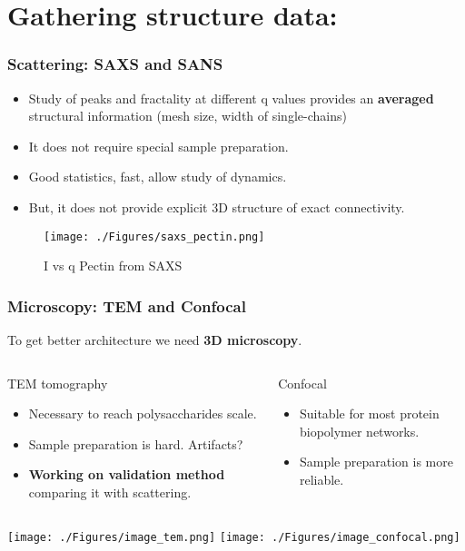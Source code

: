 \documentclass[10pt]{beamer}
\begin{document}
\section{Gathering structure data:}

\begin{frame}
  \frametitle{Scattering: SAXS and SANS}
  \begin{itemize}
    \item Study of peaks and fractality at different q values provides an \textbf{averaged} structural information (mesh size, width of single-chains)
    \item It does not require special sample preparation.
    \item Good statistics, fast, allow study of dynamics.
    \item \alert{But}, it does not provide explicit 3D structure of exact connectivity.
  \end{itemize}
    \begin{figure}[htpb]
      \texttt{[image: ./Figures/saxs\_pectin.png]}
      \caption*{\footnotesize{I vs q Pectin from SAXS}}
    \end{figure}
\end{frame}
\begin{frame}
  \frametitle{Microscopy: TEM and Confocal}
  To get better architecture we need \textbf{3D microscopy}.
  \begin{columns}[T,onlytextwidth]
      \begin{exampleblock}{TEM tomography}
          \begin{itemize}
              \item Necessary to reach polysaccharides scale.
              \item Sample preparation is hard. Artifacts?
              \item \textbf{Working on validation method} comparing it with scattering.
          \end{itemize}
      \end{exampleblock}
      \begin{exampleblock}{Confocal}
          \begin{itemize}
              \item Suitable for most protein biopolymer networks.
              \item Sample preparation is more reliable.
          \end{itemize}
      \end{exampleblock}
  \end{columns}
  \begin{columns}[T,onlytextwidth]
      \centering\texttt{[image: ./Figures/image\_tem.png]}
      \centering\texttt{[image: ./Figures/image\_confocal.png]}
  \end{columns}
\end{frame}
\end{document}
